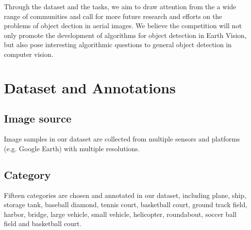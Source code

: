\documentclass[a4paper]{article}
\begin{document}
Through the dataset and the tasks, we aim to draw attention from the a wide range of communities and call for more future research and efforts on the problems of object dection in aerial images. We believe the competition will not only promote the development of algorithms for object detection in Earth Vision, but also pose interesting algorithmic questions to general object detection
in computer vision.

\section{Dataset and Annotations}

\subsection{Image source}
Image samples in our dataset are collected from multiple sensors and platforms (e.g. Google Earth) with multiple resolutions.

\subsection{Category}
Fifteen categories are chosen and annotated in our dataset, including plane, ship, storage tank, baseball diamond, tennis court, basketball court, ground track field, harbor, bridge, large vehicle, small vehicle, helicopter, roundabout, soccer ball field and basketball court.
\end{document}
